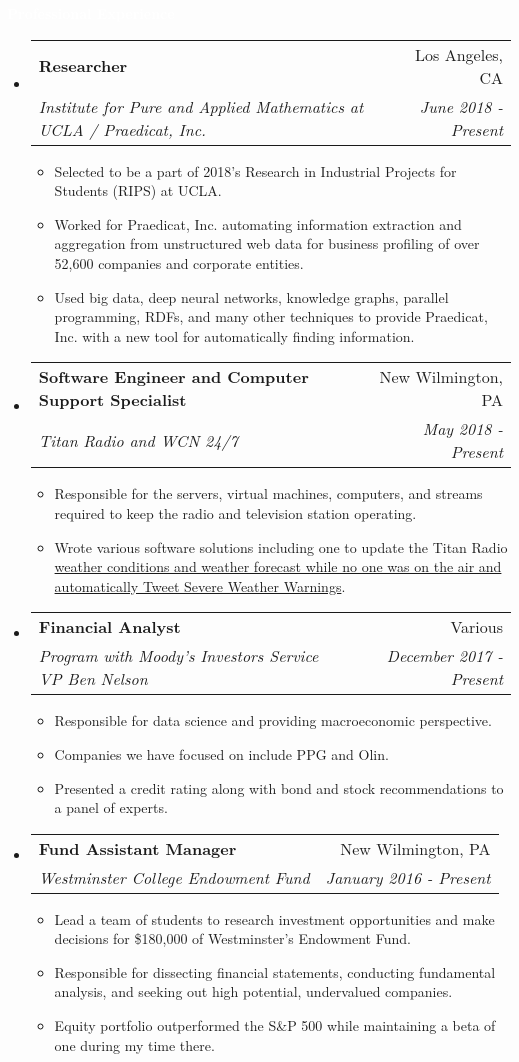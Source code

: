 \documentclass[letterpaper,11pt]{article}
\makeatletter
\newcommand{\resitem}[1]{\item #1 \vspace{-2pt}}
\newcommand{\resheading}[1]{{\large \colorbox{mypurple}{\begin{minipage}{\textwidth}{\textbf{#1 \vphantom{p\^{E}}}}\end{minipage}}}}
\newcommand{\ressubheading}[4]{
	\begin{tabular*}{7.0in}{l@{\extracolsep{\fill}}r}
		\textbf{#1} & #2 \\
		\textit{#3} & \textit{#4} \\
	\end{tabular*}\vspace{-6pt}}
\makeatother
\begin{document}
	\resheading{\textcolor{white}{Professional Experience}}
	\begin{itemize}
		\item
		\ressubheading{Researcher}{Los Angeles, CA}{Institute for Pure and Applied Mathematics at UCLA / Praedicat, Inc.}{June 2018 - Present}
		\begin{itemize}
			\resitem{Selected to be a part of 2018’s Research in Industrial Projects for Students (RIPS) at UCLA.}
			\resitem{Worked for Praedicat, Inc. automating information extraction and aggregation from unstructured web data for business profiling of over 52,600 companies and corporate entities.}
			\resitem{Used big data, deep neural networks, knowledge graphs, parallel programming, RDFs, and many other techniques to provide Praedicat, Inc. with a new tool for automatically finding information.}
		\end{itemize}
	\item
		\ressubheading{Software Engineer and Computer Support Specialist}{New Wilmington, PA}{Titan Radio and WCN 24/7}{May 2018 - Present}
		\begin{itemize}
			\resitem{Responsible for the servers, virtual machines, computers, and streams required to keep the radio and television station operating.}
			\resitem{Wrote various software solutions including one to update the Titan Radio \href{https://github.com/alexandermichels/WeatherWaves}{weather conditions and weather forecast while no one was on the air and automatically Tweet Severe Weather Warnings}.}
		\end{itemize}
		\item
		\ressubheading{Financial Analyst}{Various}{Program with Moody’s Investors Service VP Ben Nelson}{December 2017 - Present}
		\begin{itemize}
			\resitem{Responsible for data science and providing macroeconomic perspective.}
			\resitem{Companies we have focused on include PPG and Olin.}
			\resitem{Presented a credit rating along with bond and stock recommendations to a panel of experts.}
		\end{itemize}
	\item
	\ressubheading{Fund Assistant Manager}{New Wilmington, PA}{Westminster College Endowment Fund}{January 2016 - Present}
	\begin{itemize}
		\resitem{Lead a team of students to research investment opportunities and make decisions for \$180,000 of Westminster's Endowment Fund.}
		\resitem{Responsible for dissecting financial statements, conducting fundamental analysis, and seeking out high potential, undervalued companies.}
		\resitem{Equity portfolio outperformed the S\&P 500 while maintaining a beta of one during my time there.}
	\end{itemize}
	

\end{itemize}
\end{document}
